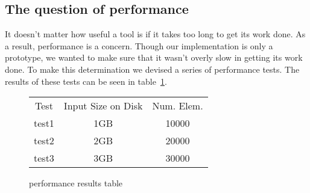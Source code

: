 \subsection{The question of performance}

It doesn't matter how useful a tool is if it takes too long to get its work
done.  As a result, performance is a concern.  Though our implementation is
only a prototype, we wanted to make sure that it wasn't overly slow in
getting its work done.  To make this determination we devised a series of
performance tests.  The results of these tests can be seen in
table~\ref{tbl:perf}.

\begin{figure}
  \begin{tabular}{|c|c|c|}
  Test & Input Size on Disk & Num. Elem. \\
  test1        & 1GB                        & 10000 \\
  test2        & 2GB                        & 20000 \\
  test3        & 3GB                        & 30000 \\
\end{tabular}
\label{tbl:perf}
\caption{performance results table}
\end{figure}

